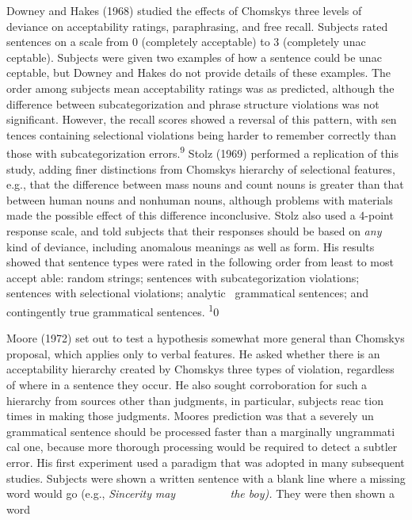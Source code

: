\begin{styleTextbody}
Downey and Hakes (1968) studied the effects of Chomsky{\textquotesingle}s three levels of deviance on acceptability ratings, paraphrasing, and free recall. Subjects rated sentences on a scale from 0 ({\textquotedbl}completely acceptable{\textquotedbl}) to 3 ({\textquotedbl}completely unac\- ceptable{\textquotedbl}). Subjects were given two examples of how a sentence could be unac\- ceptable, but Downey and Hakes do not provide details of these examples. The order among subjects{\textquotesingle} mean acceptability ratings was as predicted, although the difference between subcategorization and phrase structure violations was not significant. However, the recall scores showed a reversal of this pattern, with sen\- tences containing selectional violations being harder to remember correctly than those with subcategorization errors.\textsuperscript{9}\textsuperscript{ }Stolz (1969) performed a replication of this study, adding finer distinctions from Chomsky{\textquotesingle}s hierarchy of selectional features, e.g., that the difference between mass nouns and count nouns is greater than that between human nouns and nonhuman nouns, although problems with materials made the possible effect of this difference inconclusive. Stolz also used a 4-point response scale, and told subjects that their responses should be based on \textit{any}\textit{ }kind of deviance, including anomalous meanings as well as form. His results showed that sentence types were rated in the following order from least to most accept\- able: random strings; sentences with subcategorization violations; sentences with selectional violations; analytic \ grammatical sentences; and contingently true grammatical sentences. \textsuperscript{1}0
\end{styleTextbody}


\begin{styleTextbody}
Moore (1972) set out to test a hypothesis somewhat more general than Chomsky{\textquotesingle}s proposal, which applies only to verbal features. He asked whether there is an acceptability hierarchy created by Chomsky{\textquotesingle}s three types of violation, regardless of where in a sentence they occur. He also sought corroboration for such a hierarchy from sources other than judgments, in particular, subjects{\textquotesingle} reac\- tion times in making those judgments. Moore{\textquotesingle}s prediction was that a severely un\- grammatical sentence should be processed faster than a marginally ungrammati\- cal one, because more thorough processing would be required to detect a subtler error. His first experiment used a paradigm that was adopted in many subsequent studies. Subjects were shown a written sentence with a blank line where a missing word would go (e.g., \textit{Sincerity}\textit{ }\textit{may \ \ \ \ \ \ \ \ }\textit{\ }\textit{the boy}\textit{). }They were then shown a word
\end{styleTextbody}


